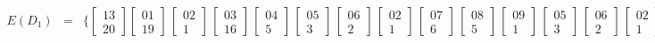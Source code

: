 \[\begin{array}{rcl}
E(D_1) &=& \{ \begin{bmatrix} 13 \\ 20 \end{bmatrix} \begin{bmatrix} 01 \\ 19 \end{bmatrix}\,\begin{bmatrix} 02 \\ 1 \end{bmatrix}\,\begin{bmatrix} 03 \\ 16 \end{bmatrix}\,\begin{bmatrix} 04 \\ 5 \end{bmatrix}\,\begin{bmatrix} 05 \\ 3 \end{bmatrix}\,\begin{bmatrix} 06 \\ 2 \end{bmatrix}\,\begin{bmatrix} 02 \\ 1 \end{bmatrix}\,\begin{bmatrix} 07 \\ 6 \end{bmatrix}\,\begin{bmatrix} 08 \\ 5 \end{bmatrix}\,\begin{bmatrix} 09 \\ 1 \end{bmatrix}\,\begin{bmatrix} 05 \\ 3 \end{bmatrix}\,\begin{bmatrix} 06 \\ 2 \end{bmatrix}\,\begin{bmatrix} 02 \\ 1 \end{bmatrix}\,\begin{bmatrix} 10 \\ 3 \end{bmatrix}\,\begin{bmatrix} 11 \\ 2 \end{bmatrix}\,\begin{bmatrix} 12 \\ 1 \end{bmatrix}\,\begin{bmatrix} 09 \\ 1 \end{bmatrix} \} \\[1em]

\end{array}\]
